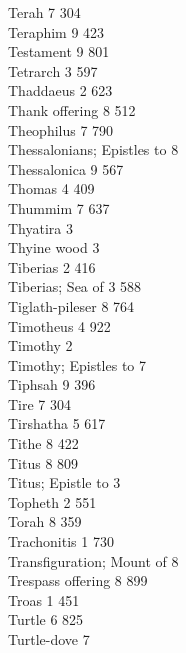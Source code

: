 Terah \hfill 7 \quad \phantom{0}304\\
Teraphim \hfill 9 \quad \phantom{0}423\\
Testament \hfill 9 \quad \phantom{0}801\\
Tetrarch \hfill 3 \quad \phantom{0}597\\
Thaddaeus \hfill 2 \quad \phantom{0}623\\
Thank offering \hfill 8 \quad \phantom{0}512\\
Theophilus \hfill 7 \quad \phantom{0}790\\
Thessalonians; Epistles to \hfill 8 \\
Thessalonica \hfill 9 \quad \phantom{0}567\\
Thomas \hfill 4 \quad \phantom{0}409\\
Thummim \hfill 7 \quad \phantom{0}637\\
Thyatira \hfill 3 \\
Thyine wood \hfill 3 \\
Tiberias \hfill 2 \quad \phantom{0}416\\
Tiberias; Sea of \hfill 3 \quad \phantom{0}588\\
Tiglath-pileser \hfill 8 \quad \phantom{0}764\\
Timotheus \hfill 4 \quad \phantom{0}922\\
Timothy \hfill 2 \\
Timothy; Epistles to \hfill 7 \\
Tiphsah \hfill 9 \quad \phantom{0}396\\
Tire \hfill 7 \quad \phantom{0}304\\
Tirshatha \hfill 5 \quad \phantom{0}617\\
Tithe \hfill 8 \quad \phantom{0}422\\
Titus \hfill 8 \quad \phantom{0}809\\
Titus; Epistle to \hfill 3 \\
Topheth \hfill 2 \quad \phantom{0}551\\
Torah \hfill 8 \quad \phantom{0}359\\
Trachonitis \hfill 1 \quad \phantom{0}730\\
Transfiguration; Mount of \hfill 8 \\
Trespass offering \hfill 8 \quad \phantom{0}899\\
Troas \hfill 1 \quad \phantom{0}451\\
Turtle \hfill 6 \quad \phantom{0}825\\
Turtle-dove \hfill 7 \\
